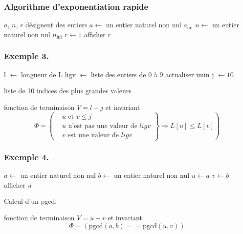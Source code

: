 \begin{frame}
 \frametitle{Algorithme d'exponentiation rapide}
\begin{algorithm}[H]
  $a$, $n$, $r$ désignent des entiers\;
  $a\longleftarrow$ un entier naturel non nul $a_{\text{ini}}$\;
  $n\longleftarrow$ un entier naturel non nul $n_{\text{ini}}$\;
  $r\longleftarrow 1$\;
  afficher $r$\;
\end{algorithm}
\end{frame}


\begin{frame}
  \frametitle{Exemple 3.}
\begin{algorithm}[H]
  l $\leftarrow$ longueur de L\;
  ligv $\leftarrow$ liste des entiers de 0 à 9\;
  actualiser  imin\;
  j $\leftarrow 10$\;
  \caption{liste de 10 indices des plus grandes valeurs}
\end{algorithm}
fonction de terminaison $V = l-j$ et invariant
\begin{displaymath}
  \Phi = 
\left( 
\left. 
\begin{aligned}
  &u \text{ et } v \leq j\\
  &u \text{ n'est pas une valeur de }ligv \\
  &v \text{ est une valeur de }ligv 
\end{aligned}
\right\rbrace 
\Rightarrow L[u] \leq L[v]
\right) 
\end{displaymath}
\end{frame}

\begin{frame}
  \frametitle{Exemple 4.}
\begin{algorithm}[H]
  $a\longleftarrow$ un entier naturel non nul\;
  $b\longleftarrow$ un entier naturel non nul\;
  $u\longleftarrow a$\;
  $v\longleftarrow b$\;
  afficher $u$\;
  \caption{Calcul d'un pgcd.}
\end{algorithm}
fonction de terminaison $V = u + v$ et invariant 
\begin{displaymath}
 \Phi = \left( \text{pgcd}(a,b) == \text{pgcd}(u,v)\right) 
\end{displaymath}
\end{frame}

